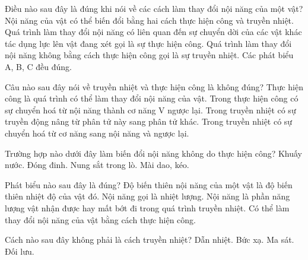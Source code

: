 \begin{ex}
Điều nào sau đây là đúng khi nói về các cách làm thay đổi nội năng của một vật?
\choice
{Nội năng của vật có thể biến đổi bằng hai cách thực hiện công và truyền nhiệt.}
{Quá trình làm thay đổi nội năng có liên quan đến sự chuyển dời của các vật khác tác dụng lực lên vật đang xét gọi là sự thực hiện công.}
{Quá trình làm thay đổi nội năng không bằng cách thực hiện công gọi là sự truyền nhiệt.}
{\True Các phát biểu A, B, C đều đúng.}
\end{ex}

\begin{ex}
Câu nào sau đây nói về truyền nhiệt và thực hiện công là không đúng?
\choice
{Thực hiện công là quá trình có thể làm thay đổi nội năng của vật.}
{Trong thực hiện công có sự chuyển hoá từ nội năng thành cơ năng V ngược lại.}
{Trong truyền nhiệt có sự truyền động nâng từ phân tử này sang phân tử khác.}
{\True Trong truyền nhiệt có sự chuyển hoá từ cơ năng sang nội năng và ngược lại.}
\end{ex}

\begin{ex}
Trường hợp nào dưới đây làm biến đổi nội năng không do thực hiện công?
\choice
{Khuấy nước.}
{Đóng đinh.}
{\True Nung sắt trong lò.}
{Mài dao, kéo.}
\end{ex}

\begin{ex}
Phát biểu nào sau đây là đúng?
\choice
{Độ biến thiên nội năng của một vật là độ biến thiên nhiệt độ của vật đó.}
{Nội năng gọi là nhiệt lượng.}
{Nội năng là phần năng lượng vật nhận được hay mất bớt đi trong quá trình truyền nhiệt.}
{\True Có thể làm thay đổi nội năng của vật bằng cách thực hiện công.}
\end{ex}

\begin{ex}
Cách nào sau đây không phải là cách truyền nhiệt?
\choice
{Dẫn nhiệt.}
{Bức xạ.}
{\True Ma sát.}
{Đối lưu.}
\end{ex}

